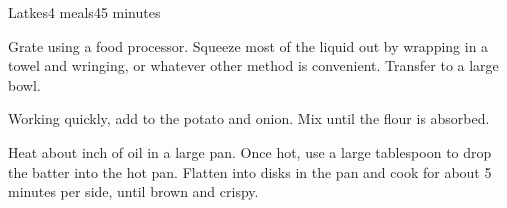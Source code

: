 \documentclass[../Cookbook.tex]{subfiles}
\begin{document}
\begin{recipe}[Latke]{Latkes}{4 meals}{45 minutes}

Grate using a food processor. Squeeze most of the liquid out by wrapping in a towel and wringing, or whatever other method is convenient.
Transfer to a large bowl.

Working quickly, add to the potato and onion. Mix until the flour is absorbed.

Heat about  inch of oil in a large pan. Once hot, use a large tablespoon to drop the batter into the hot pan. Flatten into disks in the pan and cook for about 5 minutes per side, until brown and crispy.

\end{recipe}
\end{document}
